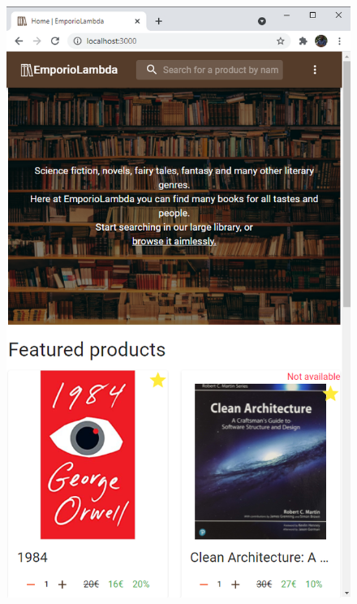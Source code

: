 \begin{figure}[h!]
	\centering
	\includegraphics[scale=0.5]{Immagini/Acquirente/Home Mobile WithoutMenu.png} \quad

\end{figure}
